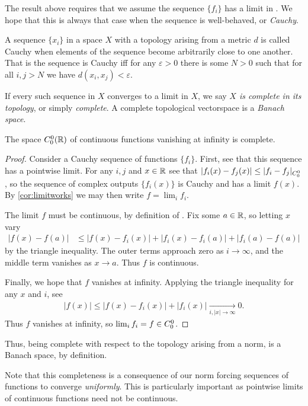       The result above requires that we assume the sequence $\{f_i\}$ has a limit in \Coo.
      We hope that this is always that case when the sequence is well-behaved, or \emph{Cauchy}.
      \begin{defn}
        A sequence $\{x_i\}$ in a space $X$ with a topology arising from a metric $d$ is called Cauchy when elements of the sequence become arbitrarily close to one another.
        That is the sequence is Cauchy iff for any $\varepsilon>0$ there is some $N>0$ such that for all $i,j>N$ we have $d(x_i,x_j)<\varepsilon$.

        If every such sequence in $X$ converges to a limit in $X$, we say \emph{$X$ is complete in its topology}, or simply \emph{complete}.
        A complete topological vectorspace is a \emph{Banach space}.
      \end{defn}

      \begin{thm}
        \label{thm:c00complete}
        The space ${C^0_0}(\mathbb{R})$ of continuous functions vanishing at infinity is complete.
      \end{thm}
      \begin{proof}
        Consider a Cauchy sequence of \Coo functions $\{f_i\}$.
        First, see that this sequence has a pointwise limit.
        For any $i,j$ and $x\in\mathbb{R}$ see that $|f_i(x)-f_j(x)| \le |f_i-f_j|_{C^0_0}$, so the sequence of complex outputs $\{f_i(x)\}$ is Cauchy and has a limit $f(x)$.
        By \cref{cor:limitworks} we may then write $f=\lim_i f_i$.

        The limit $f$ must be continuous, by definition of \Coo.
        Fix some $a\in\mathbb{R}$, so letting $x$ vary
        \begin{align*}
          |f(x)-f(a)|
          &\le |f(x)-f_i(x)|+|f_i(x)-f_i(a)|+|f_i(a)-f(a)|
        \end{align*}
        by the triangle inequality.
        The outer terms approach zero as $i\rightarrow\infty$, and the middle term vanishes as $x\rightarrow a$.
        Thus $f$ is continuous.

        Finally, we hope that $f$ vanishes at infinity.
        Applying the triangle inequality for any $x$ and $i$, see
        \begin{align*}
          |f(x)| \le |f(x)-f_i(x)| + |f_i(x)|
          \underset{i, |x|\rightarrow\infty}{\longrightarrow} 0\text{.}
        \end{align*}
        Thus $f$ vanishes at infinity, so $\lim_i f_i = f\in{C^0_0}$.
      \end{proof}
      \begin{rmk}
        Thus, being complete with respect to the topology arising from a norm, \Coo is a Banach space, by definition.
      \end{rmk}
      \begin{rmk}
        Note that this completeness is a consequence of our norm forcing sequences of functions to converge \emph{uniformly}.
        This is particularly important as pointwise limits of continuous functions need not be continuous.
      \end{rmk}

